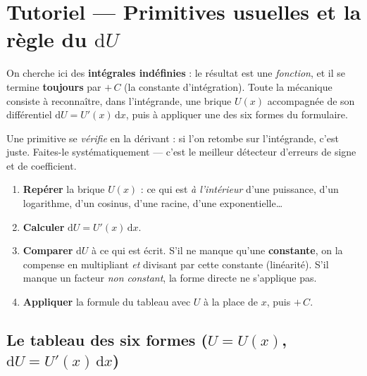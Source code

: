 \documentclass[11pt,a4paper]{article}
\newcommand{\dd}{\mathrm{d}}
\begin{document}
\section*{Tutoriel — Primitives usuelles et la règle du $\dd U$}

On cherche ici des \textbf{intégrales indéfinies} : le résultat est une \emph{fonction}, et il se
termine \textbf{toujours} par $+\,C$ (la constante d'intégration). Toute la mécanique consiste à
reconnaître, dans l'intégrande, une brique $U(x)$ accompagnée de son différentiel
$\dd U = U'(x)\,\dd x$, puis à appliquer une des six formes du formulaire.

\begin{idee}
Une primitive se \emph{vérifie} en la dérivant : si l'on retombe sur l'intégrande, c'est juste.
Faites-le systématiquement — c'est le meilleur détecteur d'erreurs de signe et de coefficient.
\end{idee}

\begin{methode}[la règle du $\dd U$ en 4 gestes]
\begin{enumerate}[leftmargin=1.9em,topsep=2pt,itemsep=2pt]
  \item \textbf{Repérer} la brique $U(x)$ : ce qui est \emph{à l'intérieur} d'une puissance, d'un
        logarithme, d'un cosinus, d'une racine, d'une exponentielle\dots
  \item \textbf{Calculer} $\dd U = U'(x)\,\dd x$.
  \item \textbf{Comparer} $\dd U$ à ce qui est écrit. S'il ne manque qu'une \textbf{constante}, on
        la compense en multipliant \emph{et} divisant par cette constante (linéarité). S'il manque
        un facteur \emph{non constant}, la forme directe ne s'applique pas.
  \item \textbf{Appliquer} la formule du tableau avec $U$ à la place de $x$, puis $+\,C$.
\end{enumerate}
\end{methode}

\subsection*{Le tableau des six formes ($U=U(x)$, $\dd U=U'(x)\,\dd x$)}
\end{document}
